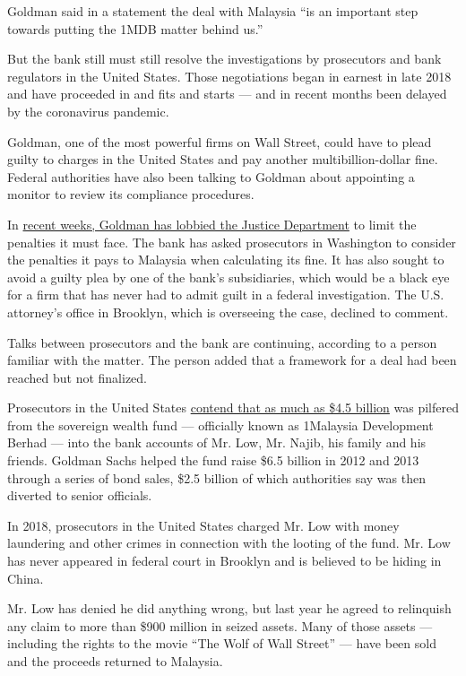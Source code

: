 Goldman said in a statement the deal with Malaysia ``is an important
step towards putting the 1MDB matter behind us.''

But the bank still must still resolve the investigations by prosecutors
and bank regulators in the United States. Those negotiations began in
earnest in late 2018 and have proceeded in and fits and starts --- and
in recent months been delayed by the coronavirus pandemic.

Goldman, one of the most powerful firms on Wall Street, could have to
plead guilty to charges in the United States and pay another
multibillion-dollar fine. Federal authorities have also been talking to
Goldman about appointing a monitor to review its compliance procedures.

In
\href{https://www.nytimes3xbfgragh.onion/2020/06/11/business/goldman-sachs-1mdb-malaysia.html}{recent
weeks, Goldman has lobbied the Justice Department} to limit the
penalties it must face. The bank has asked prosecutors in Washington to
consider the penalties it pays to Malaysia when calculating its fine. It
has also sought to avoid a guilty plea by one of the bank's
subsidiaries, which would be a black eye for a firm that has never had
to admit guilt in a federal investigation. The U.S. attorney's office in
Brooklyn, which is overseeing the case, declined to comment.

Talks between prosecutors and the bank are continuing, according to a
person familiar with the matter. The person added that a framework for a
deal had been reached but not finalized.

Prosecutors in the United States
\href{https://www.justice.gov/opa/pr/us-seeks-recover-approximately-540-million-obtained-corruption-involving-malaysian-sovereign}{contend
that as much as \$4.5 billion} was pilfered from the sovereign wealth
fund --- officially known as 1Malaysia Development Berhad --- into the
bank accounts of Mr. Low, Mr. Najib, his family and his friends. Goldman
Sachs helped the fund raise \$6.5 billion in 2012 and 2013 through a
series of bond sales, \$2.5 billion of which authorities say was then
diverted to senior officials.

In 2018, prosecutors in the United States charged Mr. Low with money
laundering and other crimes in connection with the looting of the fund.
Mr. Low has never appeared in federal court in Brooklyn and is believed
to be hiding in China.

Mr. Low has denied he did anything wrong, but last year he agreed to
relinquish any claim to more than \$900 million in seized assets. Many
of those assets --- including the rights to the movie ``The Wolf of Wall
Street'' --- have been sold and the proceeds returned to Malaysia.

